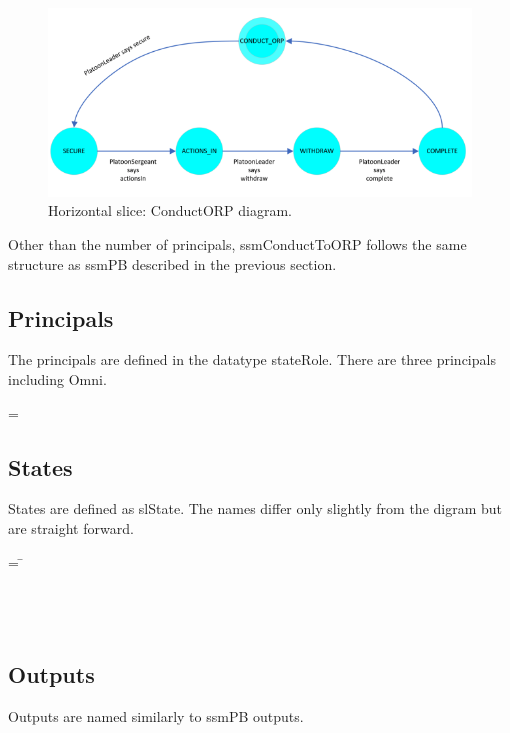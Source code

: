 \documentclass[../../main/main.tex]{subfiles}
\begin{document}
\begin{figure}[h!]
\centering
\includegraphics[width=\textwidth]{../figures/ssmConductORPDiagram}
\caption{\label{ssmConductORPDiagram2} Horizontal slice: ConductORP diagram.}
\end{figure}


Other than the number of principals, ssmConductToORP follows the same structure as ssmPB described in the previous section.  

\subsection{Principals}
The principals are defined in the datatype stateRole.  There are three principals including Omni.

 =  \HOLTokenBar{}  \HOLTokenBar{} 

\subsection{States}
States are defined as slState.  The names differ only slightly from the digram but are straight forward.  
\begin{tabbing}
 = \= \\
					\>\HOLTokenBar{}  \\
					\>\HOLTokenBar{}  \\
					\>\HOLTokenBar{} \\
        					\>\HOLTokenBar{} 
\end{tabbing}

\subsection{Outputs}
Outputs are named similarly to ssmPB outputs.
\end{document}
